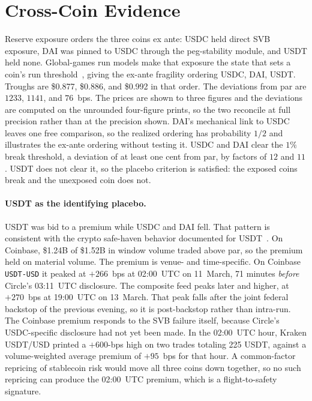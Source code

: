 \section{Cross-Coin Evidence}
\label{sec:placebo}

Reserve exposure orders the three coins ex ante: USDC held direct SVB exposure, DAI was
pinned to USDC through the peg-stability module, and USDT held none. Global-games run
models make that exposure the state that sets a coin's run
threshold~\cite{carlssonvandamme1993,morrisshin1998,goldsteinpauzner2005,mzz2025}, giving
the ex-ante fragility ordering USDC, DAI, USDT. Troughs are \$0.877, \$0.886, and
\$0.992 in that order. The deviations from par are $1233$, $1141$, and $76$~bps. The
prices are shown to three figures and the deviations are computed on the unrounded four-figure prints, so the two reconcile at full precision rather than at the precision
shown. DAI's mechanical link to USDC leaves one free
comparison, so the realized ordering has probability $1/2$ and illustrates the ex-ante
ordering without testing it. USDC and DAI clear the $1\%$
break threshold, a deviation of at least one cent from par, by factors of
$12$ and $11$. USDT does not clear it, so the placebo criterion is satisfied: the
exposed coins break and the unexposed coin does not.

\paragraph{USDT as the identifying placebo.} USDT was bid to a premium while USDC and
DAI fell. That pattern is consistent with the crypto safe-haven behavior documented for
USDT~\cite{Baur_2021}. On Coinbase, \$1.24B of \$1.52B in
window volume traded above par, so the premium held on material volume. The
premium is venue- and time-specific. On Coinbase \texttt{USDT-USD} it peaked
at $+266$~bps at 02:00~UTC on 11~March, 71 minutes \emph{before} Circle's
03:11~UTC disclosure. The composite feed peaks later and higher, at $+270$~bps at
19:00~UTC on 13~March. That peak falls after the joint federal backstop of the previous
evening, so it is post-backstop rather than intra-run. The
Coinbase premium responds to the SVB failure itself, because Circle's
USDC-specific disclosure had not yet been made. In the 02:00~UTC
hour, Kraken USDT/USD printed a $+600$-bps high on two trades totaling 225
USDT, against a volume-weighted average premium of $+95$~bps for that hour. A
common-factor repricing of stablecoin risk would move all three coins down
together, so no such repricing can produce the 02:00~UTC premium, which is a
flight-to-safety signature.
